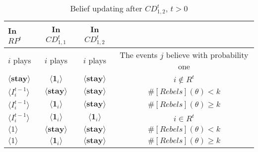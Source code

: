 \documentclass[12pt,letter]{article}
\theoremstyle{definition}
\theoremstyle{remark}
\theoremstyle{claim}
\begin{document}
\begin{table}[ht]
\caption{Belief updating after $CD^t_{1,2}$, $t>0$}
\label{Table_blf_up_cdt12}
\begin{center}
\begin{tabular}{l c c c}
In $RP^t$ 	 	&  	In $CD^t_{1,1}$		&  In $CD^t_{1,2}$	  &\\
\hline
\hline
$i$ plays 		                             &  	$i$ plays		&				$i$ plays			& The events $j$ believe with probability one  \\
\hline
$\langle  \textbf{stay} \rangle$ 	& 	$\langle \mathbf{1}_i \rangle$	&  $\langle \textbf{stay} \rangle$ &  $i\notin R^t$ \\
$\langle  {I^{t-1}_i} \rangle$ 		&  $\langle \textbf{stay} \rangle$	&	$\langle \textbf{stay} \rangle$ &  $\#[Rebels](\theta)< k$   \\
$\langle  {I^{t-1}_i} \rangle$ 		&  $\langle \mathbf{1}_i \rangle$	&	$\langle \textbf{stay} \rangle$ &  $\#[Rebels](\theta)\geq k$    \\
$\langle  {I^{t-1}_i} \rangle$ 		&  $\langle \mathbf{1}_i \rangle$	&	$\langle \mathbf{1}_i \rangle$ &  $i\in R^t$  \\
$\langle 1 \rangle$ 		             &  $\langle \textbf{stay} \rangle$	&	$\langle \textbf{stay} \rangle$ &  $\#[Rebels](\theta)< k$\\
$\langle 1 \rangle$ 		             &  $\langle \mathbf{1}_i \rangle$	&	$\langle \textbf{stay} \rangle$ & $\#[Rebels](\theta)\geq k$
\end{tabular}
\end{center}
\end{table}
\end{document}
